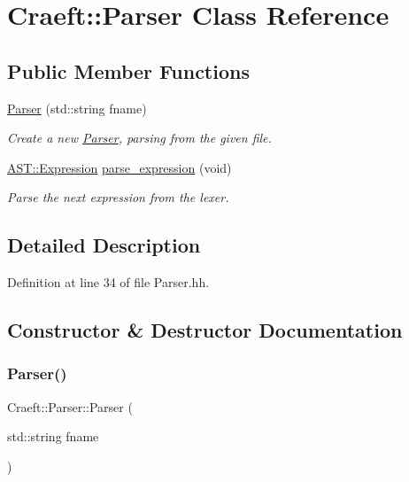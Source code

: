 \hypertarget{class_craeft_1_1_parser}{}\section{Craeft\+:\+:Parser Class Reference}
\label{class_craeft_1_1_parser}
\subsection*{Public Member Functions}
\begin{DoxyCompactItemize}
\item 
\hyperlink{class_craeft_1_1_parser_a584edbe348c503996ad4f0583b843520}{Parser} (std\+::string fname)
\begin{DoxyCompactList}\small\item\em Create a new \hyperlink{class_craeft_1_1_parser}{Parser}, parsing from the given file. \end{DoxyCompactList}\item 
\hyperlink{_expression_8hh_aef28cabf6d8e7cb8324232e27e69606d}{A\+S\+T\+::\+Expression} \hyperlink{class_craeft_1_1_parser_ae991d774fc82c09ec4a4223b883580a9}{parse\+\_\+expression} (void)
\begin{DoxyCompactList}\small\item\em Parse the next expression from the lexer. \end{DoxyCompactList}\end{DoxyCompactItemize}


\subsection{Detailed Description}


Definition at line 34 of file Parser.\+hh.



\subsection{Constructor \& Destructor Documentation}
\hypertarget{class_craeft_1_1_parser_a584edbe348c503996ad4f0583b843520}{}\label{class_craeft_1_1_parser_a584edbe348c503996ad4f0583b843520} 
\subsubsection{\texorpdfstring{Parser()}{Parser()}}
{\footnotesize\ttfamily Craeft\+::\+Parser\+::\+Parser (\begin{DoxyParamCaption}\item[{std\+::string}]{fname }\end{DoxyParamCaption})}



